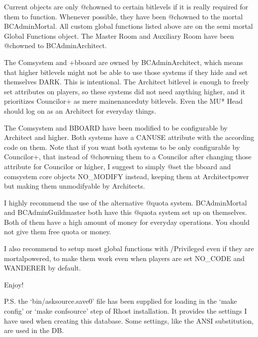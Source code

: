 \documentclass[letterpaper,10pt,english]{sphinxmanual}
\begin{document}
\sphinxAtStartPar
Current objects are only @chowned to certain bitlevels if it is really required
for them to function. Whenever possible, they have been @chowned to the mortal
BC\sphinxhyphen{}Admin\sphinxhyphen{}Mortal. All custom global functions listed above are on the semi\sphinxhyphen{}
\sphinxhyphen{}mortal Global Functions object. The Master Room and Auxiliary Room have been
@chowned to BC\sphinxhyphen{}Admin\sphinxhyphen{}Architect.

\sphinxAtStartPar
The Comsystem and +bboard are owned by BC\sphinxhyphen{}Admin\sphinxhyphen{}Architect, which means that
higher bitlevels might not be able to use those systems if they hide and set
themselves DARK. This is intentional. The Architect bitlevel is enough to freely
set attributes on players, so these systems did not need anything higher, and
it prioritizes Councilor+ as mere mainenance\sphinxhyphen{}duty bitlevels. Even the MU* Head
should log on as an Architect for everyday things.

\sphinxAtStartPar
The Comsystem and BBOARD have been modified to be configurable by Architect and
higher. Both systems have a CANUSE attribute with the according code on them.
Note that if you want both systems to be only configurable by Councilor+, that
instead of @chowning them to a Councilor after changing those attribute for
Councilor or higher, I suggest to simply @set the bboard and comsystem core
objects NO\_MODIFY instead, keeping them at Architect\sphinxhyphen{}power but making them
unmodifyable by Architects.

\sphinxAtStartPar
I highly recommend the use of the alternative @quota system. BC\sphinxhyphen{}Admin\sphinxhyphen{}Mortal
and BC\sphinxhyphen{}Admin\sphinxhyphen{}Guildmaster both have this @quota system set up on themselves. Both
of them have a high amount of money for everyday operations. You should not give
them free quota or money.

\sphinxAtStartPar
I also recommend to setup most global functions with /Privileged even if they
are mortal\sphinxhyphen{}powered, to make them work even when players are set NO\_CODE and
WANDERER by default.

\sphinxAtStartPar
Enjoy!

\sphinxAtStartPar
P.S. the ‘bin/asksource.save0’ file has been supplied for loading in the
‘make config’ or ‘make confsource’ step of Rhost installation. It provides the
settings I have used when creating this database. Some settings, like the ANSI
substitution, are used in the DB.
\end{document}
